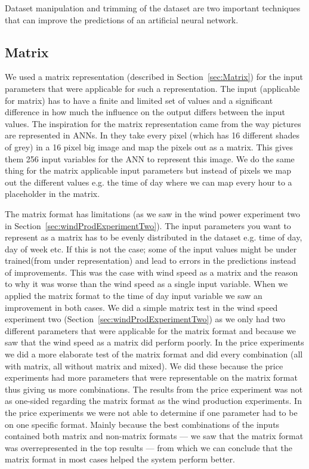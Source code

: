 Dataset manipulation and trimming of the dataset are two important techniques that can improve the predictions of an artificial neural network.
\subsection{Matrix}
We used a matrix representation (described in Section~\ref{sec:Matrix}) for the input parameters that were applicable for such a representation. The input (applicable for matrix) has to have a finite and limited set of values and a significant difference in how much the influence on the output differs between the input values. The inspiration for the matrix representation came from the way pictures are represented in ANNs. In \cite{knerr1992handwritten} they take every pixel (which has 16 different shades of grey) in a 16 pixel big image and map the pixels out as a matrix. This gives them 256 input variables for the ANN to represent this image. We do the same thing for the matrix applicable input parameters but instead of pixels we map out the different values e.g. the time of day where we can map every hour to a placeholder in the matrix.

The matrix format has limitations (as we saw in the wind power experiment two in Section~\ref{sec:windProdExperimentTwo}). The input parameters you want to represent as a matrix has to be evenly distributed in the dataset e.g. time of day, day of week etc. If this is not the case; some of the input values might be under trained(from under representation) and lead to errors in the predictions instead of improvements. This was the case with wind speed as a matrix and the reason to why it was worse than the wind speed as a single input variable. When we applied the matrix format to the time of day input variable we saw an improvement in both cases. We did a simple matrix test in the wind speed experiment two (Section~\ref{sec:windProdExperimentTwo}) as we only had two different parameters that were applicable for the matrix format and because we saw that the wind speed as a matrix did perform poorly. In the price experiments we did a more elaborate test of the matrix format and did every combination (all with matrix, all without matrix and mixed). We did these because the price experiments had more parameters that were representable on the matrix format thus giving us more combinations. The results from the price experiment was not as one-sided regarding the matrix format as the wind production experiments. In the price experiments we were not able to determine if one parameter had to be on one specific format. Mainly because the best combinations of the inputs contained both matrix and non-matrix formats --- we saw that the matrix format was overrepresented in the top results --- from which we can conclude that the matrix format in most cases helped the system perform better.

